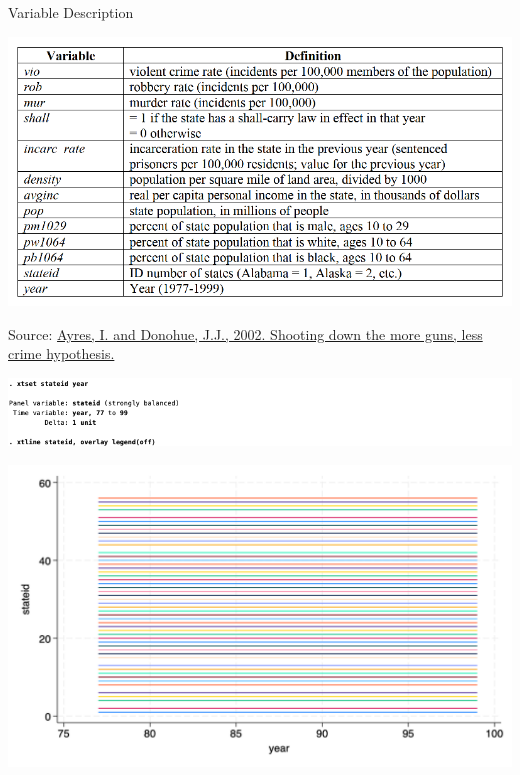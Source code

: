 \documentclass[
  10pt,
  ignorenonframetext,
]{beamer}
\begin{document}
\begin{frame}{Variable Description}
\protect\hypertarget{variable-description}{}
\begin{center}\includegraphics[width=0.95\linewidth]{pictures/Ex1-VarDef} \end{center}
\footnotesize

Source:
\href{https://ianayres.yale.edu/sites/default/files/files/Ayres_Donohue_article.pdf}{Ayres,
I. and Donohue, J.J., 2002. Shooting down the more guns, less crime
hypothesis.}
\end{frame}

\begin{frame}{}
\protect\hypertarget{section}{}
\begin{center}\includegraphics[width=1\linewidth]{pictures/Ex1-xtset-xtline} \end{center}

\begin{center}\includegraphics[width=1\linewidth]{pictures/Q1-panelView} \end{center}
\end{frame}
\end{document}
